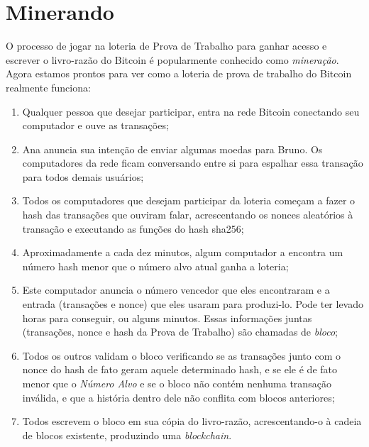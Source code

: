 
\chapter*{Minerando}
\label{ch:capitulo5}
\setcounter{chapter}{5}

O processo de jogar na loteria de Prova de Trabalho para ganhar acesso e escrever o livro-razão do Bitcoin é popularmente conhecido como \textit{mineração}.
Agora estamos prontos para ver como a loteria de prova de trabalho do Bitcoin realmente funciona:

\begin{enumerate}
\item Qualquer pessoa que desejar participar, entra na rede Bitcoin conectando seu computador e ouve as transações;
\item Ana anuncia sua intenção de enviar algumas moedas para Bruno. Os computadores da rede ficam conversando entre si para espalhar essa transação para todos demais usuários;
\item Todos os computadores que desejam participar da loteria começam a fazer o hash das transações que ouviram falar, acrescentando os nonces aleatórios à transação e executando as funções do hash sha256;
\item Aproximadamente a cada dez minutos, algum computador a encontra um número hash menor que o número alvo atual ganha a loteria;
\item Este computador anuncia o número vencedor que eles encontraram e a entrada (transações e nonce) que eles usaram para produzi-lo. Pode ter levado horas para conseguir, ou alguns minutos. Essas informações juntas (transações, nonce e hash da Prova de Trabalho) são chamadas de \textit{bloco};
\item Todos os outros validam o bloco verificando se as transações junto com o nonce do hash de fato geram aquele determinado hash, e se ele é de fato menor que o \textit{Número Alvo} e se o bloco não contém nenhuma transação inválida, e que a história dentro dele não conflita com blocos anteriores;
\item Todos escrevem o bloco em sua cópia do livro-razão, acrescentando-o à cadeia de blocos existente, produzindo uma \textit{blockchain}.
\end{enumerate}

